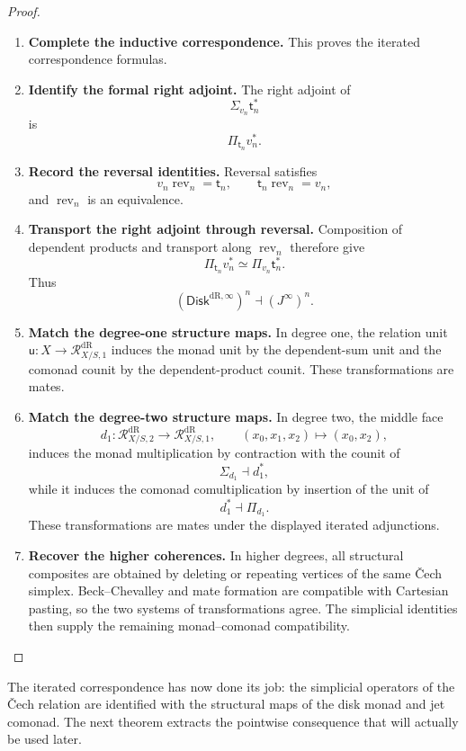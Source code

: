 \begin{proof}
\begin{enumerate}[label=\textup{(\arabic*)}]
    \item \textbf{Complete the inductive correspondence.}
This proves the iterated correspondence formulas.

    \item \textbf{Identify the formal right adjoint.}
The right adjoint of
\[
  \Sigma_{v_n}\mathsf t_n^*
\]
is
\[
  \Pi_{\mathsf t_n}v_n^*.
\]

    \item \textbf{Record the reversal identities.}
Reversal satisfies
\[
  v_n\operatorname{rev}_n=\mathsf t_n,
  \qquad
  \mathsf t_n\operatorname{rev}_n=v_n,
\]
and \(\operatorname{rev}_n\) is an equivalence.

    \item \textbf{Transport the right adjoint through reversal.}
Composition of dependent products and
transport along \(\operatorname{rev}_n\) therefore give
\[
  \Pi_{\mathsf t_n}v_n^*
  \simeq
  \Pi_{v_n}\mathsf t_n^*.
\]
Thus
\[
  (\mathsf{Disk}^{\mathrm{dR},\infty})^n\dashv(J^\infty)^n.
\]

    \item \textbf{Match the degree-one structure maps.}
In degree one, the relation unit \(\mathsf u:X\to\mathcal R^{\mathrm{dR}}_{X/S,1}\) induces
the monad unit by the dependent-sum unit and the comonad counit by the
dependent-product counit. These transformations are mates.

    \item \textbf{Match the degree-two structure maps.}
In degree two, the middle face
\[
  d_1:\mathcal R^{\mathrm{dR}}_{X/S,2}\to\mathcal R^{\mathrm{dR}}_{X/S,1},
  \qquad
  (x_0,x_1,x_2)\longmapsto(x_0,x_2),
\]
induces the monad multiplication by contraction with the counit of
\[
  \Sigma_{d_1}\dashv d_1^*,
\]
while it induces the comonad comultiplication by insertion of the unit of
\[
  d_1^*\dashv\Pi_{d_1}.
\]
These transformations are mates under the displayed iterated adjunctions.

    \item \textbf{Recover the higher coherences.}
In higher degrees, all structural composites are obtained by deleting or
repeating vertices of the same \v{C}ech simplex. Beck--Chevalley and mate formation are compatible with Cartesian pasting, so
the two systems of transformations agree. The simplicial identities then
supply the remaining monad--comonad compatibility.
\end{enumerate}
\end{proof}

The iterated correspondence has now done its job: the simplicial operators of
the \v{C}ech relation are identified with the structural maps of the disk
monad and jet comonad. The next theorem extracts the pointwise consequence
that will actually be used later.


